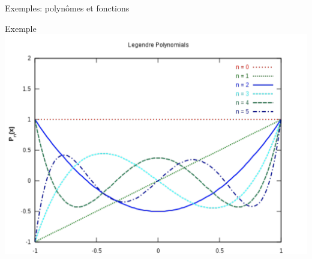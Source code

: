 \begin{parag}{Exemples: polynômes et fonctions}
\begin{subparag}{Exemple}
                \includegraphics[scale = 0.5]{Algèbre linéàaire/Screenshot 2024-12-10 163537.png}
                
            \end{subparag}
            
        \end{parag}

